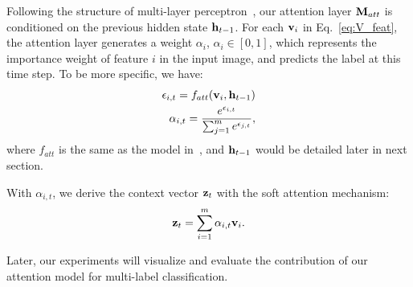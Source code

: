 \documentclass[letterpaper]{article} %
\begin{document}
Following the structure of multi-layer perceptron~\cite{xu2015show}, our attention layer $\mathbf{M}_{att}$ is conditioned on the previous hidden state $\mathbf{h}_{t-1}$. For each $\mathbf{v}_i$ in Eq.~\ref{eq:V_feat}, the attention layer generates a weight $\alpha_i$, $\alpha_i \in [0, 1]$, which represents the importance weight of feature $i$ in the input image, and predicts the label at this time step. To be more specific, we have:
\begin{equation}
\label{eq:atten_weight}
\begin{aligned}
\epsilon_{i,t} = f_{att}(\mathbf{v}_i, \mathbf{h}_{t-1}) \\
\alpha_{i,t} = \frac{e^{\epsilon_{i,t}} }{ \sum_{j=1}^m e^{\epsilon_{j,t}}},
\end{aligned}
\end{equation}
where $f_{att}$ is the same as the model in~\cite{xu2015show}, and $\mathbf{h}_{t-1}$ would be detailed later in next section.

With $\alpha_{i,t}$, we derive the context vector $\mathbf{z}_t$ with the soft attention mechanism:
\begin{equation}
\label{eq:context}
\begin{aligned}
\mathbf{z}_t = \sum_{i=1}^m \alpha_{i,t}\mathbf{v}_i.
\end{aligned}
\end{equation}

Later, our experiments will visualize and evaluate the contribution of our attention model for multi-label classification.\\
\end{document}
